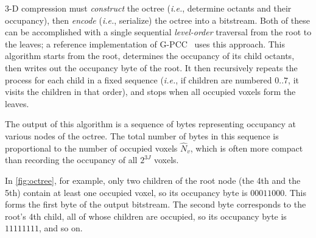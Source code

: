 %
3-D compression must \textit{construct} the octree (\textit{i.e.}, determine octants and their occupancy), then \textit{encode} (\textit{i.e.}, serialize) the octree into a bitstream.
%
Both of these can be accomplished with a single sequential \textit{level-order} traversal from the root to the leaves; a reference implementation of G-PCC~\cite{gpcc-github} uses this approach.
%
This algorithm starts from the root, determines the occupancy of its child octants, then writes out the occupancy byte of the root.
%
It then recursively repeats the process for each child in a fixed sequence (\textit{i.e.}, if children are numbered $0..7$, it visits the children in that order), and stops when all occupied voxels form the leaves.

The output of this algorithm is a sequence of bytes representing occupancy at various nodes of the octree.
%
The total number of bytes in this sequence is proportional to the number of occupied voxels $\hat{N}_v$, which is often more compact than recording the occupancy of all $2^{3J}$ voxels.%

In \cref{fig:octree}, for example, only two children of the root node (the 4th and the 5th) contain at least one occupied voxel, so its occupancy byte is $00011000$.
%
This forms the first byte of the output bitstream.
%
The second byte corresponds to the root's 4th child, all of whose children are occupied, so its occupancy byte is $11111111$, and so on.

